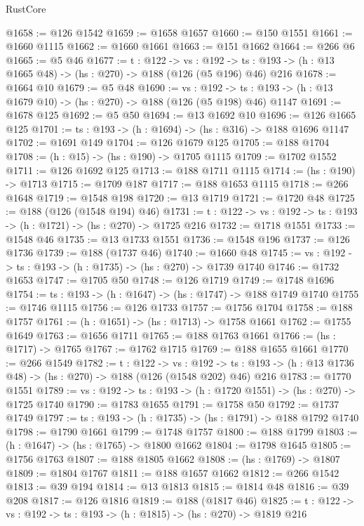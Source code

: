 \begin{lexlean}{RustCore}
\begin{coremodule}
@1658 := @126 @1542
@1659 := @1658 @1657
@1660 := @150 @1551
@1661 := @1660 @1115
@1662 := @1660 @1661
@1663 := @151 @1662
@1664 := @266 @6
@1665 := @5 @46
@1677 := {t : @122} ->
  {vs : @192} -> {ts : @193} -> (h : @13 @1665 @48) -> (hs : @270) -> @188 (@126 (@5 @196) @46) @216
@1678 := @1664 @10
@1679 := @5 @48
@1690 := {vs : @192} ->
  {ts : @193} -> (h : @13 @1679 @10) -> (hs : @270) -> @188 (@126 (@5 @198) @46) @1147
@1691 := @1678 @125
@1692 := @5 @50
@1694 := @13 @1692 @10
@1696 := @126 @1665 @125
@1701 := {ts : @193} -> (h : @1694) -> (hs : @316) -> @188 @1696 @1147
@1702 := @1691 @149
@1704 := @126 @1679 @125
@1705 := @188 @1704
@1708 := (h : @15) -> (hs : @190) -> @1705 @1115
@1709 := @1702 @1552
@1711 := @126 @1692 @125
@1713 := @188 @1711 @1115
@1714 := (hs : @190) -> @1713
@1715 := @1709 @187
@1717 := @188 @1653 @1115
@1718 := @266 @1648
@1719 := @1548 @198
@1720 := @13 @1719
@1721 := @1720 @48
@1725 := @188 (@126 (@1548 @194) @46)
@1731 := {t : @122} -> {vs : @192} -> {ts : @193} -> (h : @1721) -> (hs : @270) -> @1725 @216
@1732 := @1718 @1551
@1733 := @1548 @46
@1735 := @13 @1733 @1551
@1736 := @1548 @196
@1737 := @126 @1736
@1739 := @188 (@1737 @46)
@1740 := @1660 @48
@1745 := {vs : @192} -> {ts : @193} -> (h : @1735) -> (hs : @270) -> @1739 @1740
@1746 := @1732 @1653
@1747 := @1705 @50
@1748 := @126 @1719
@1749 := @1748 @1696
@1754 := {ts : @193} -> (h : @1647) -> (hs : @1747) -> @188 @1749 @1740
@1755 := @1746 @1115
@1756 := @126 @1733
@1757 := @1756 @1704
@1758 := @188 @1757
@1761 := (h : @1651) -> (hs : @1713) -> @1758 @1661
@1762 := @1755 @1649
@1763 := @1656 @1711
@1765 := @188 @1763 @1661
@1766 := (hs : @1717) -> @1765
@1767 := @1762 @1715
@1769 := @188 @1655 @1661
@1770 := @266 @1549
@1782 := {t : @122} ->
  {vs : @192} ->
  {ts : @193} -> (h : @13 @1736 @48) -> (hs : @270) -> @188 (@126 (@1548 @202) @46) @216
@1783 := @1770 @1551
@1789 := {vs : @192} -> {ts : @193} -> (h : @1720 @1551) -> (hs : @270) -> @1725 @1740
@1790 := @1783 @1655
@1791 := @1758 @50
@1792 := @1737 @1749
@1797 := {ts : @193} -> (h : @1735) -> (hs : @1791) -> @188 @1792 @1740
@1798 := @1790 @1661
@1799 := @1748 @1757
@1800 := @188 @1799
@1803 := (h : @1647) -> (hs : @1765) -> @1800 @1662
@1804 := @1798 @1645
@1805 := @1756 @1763
@1807 := @188 @1805 @1662
@1808 := (hs : @1769) -> @1807
@1809 := @1804 @1767
@1811 := @188 @1657 @1662
@1812 := @266 @1542
@1813 := @39 @194
@1814 := @13 @1813
@1815 := @1814 @48
@1816 := @39 @208
@1817 := @126 @1816
@1819 := @188 (@1817 @46)
@1825 := {t : @122} -> {vs : @192} -> {ts : @193} -> (h : @1815) -> (hs : @270) -> @1819 @216

\end{coremodule}
\end{lexlean}
